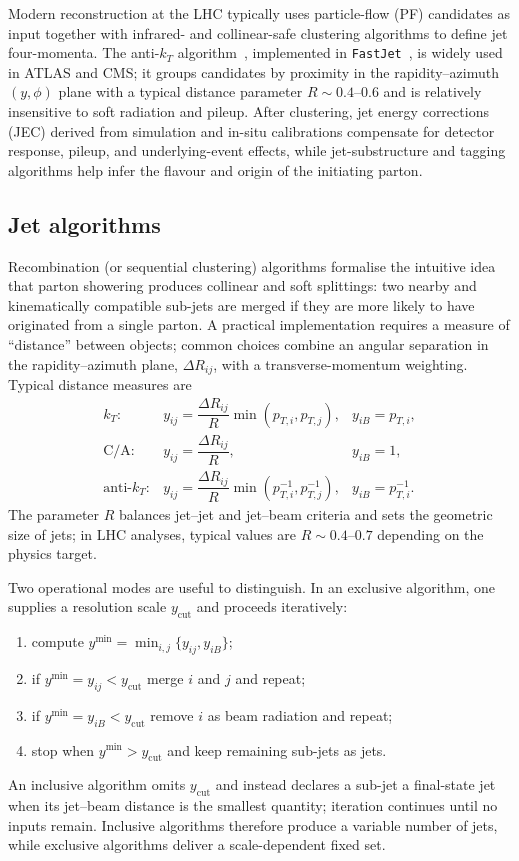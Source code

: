 Modern reconstruction at the LHC typically uses particle-flow (PF) candidates as input together with infrared- and collinear-safe clustering algorithms to define jet four-momenta. The anti-$k_T$ algorithm~\parencite{Cacciari:2008gp}, implemented in \texttt{FastJet}~\parencite{Cacciari:2011ma}, is widely used in ATLAS and CMS; it groups candidates by proximity in the rapidity–azimuth $(y,\phi)$ plane with a typical distance parameter $R\sim0.4$–0.6 and is relatively insensitive to soft radiation and pileup. After clustering, jet energy corrections (JEC) derived from simulation and in-situ calibrations compensate for detector response, pileup, and underlying-event effects, while jet-substructure and tagging algorithms help infer the flavour and origin of the initiating parton.

\subsection{Jet algorithms}

Recombination (or sequential clustering) algorithms formalise the intuitive idea that parton showering produces collinear and soft splittings: two nearby and kinematically compatible sub-jets are merged if they are more likely to have originated from a single parton. A practical implementation requires a measure of ``distance'' between objects; common choices combine an angular separation in the rapidity–azimuth plane, $\Delta R_{ij}$, with a transverse-momentum weighting. Typical distance measures are
\[
\begin{array}{lll}
k_T: & y_{ij}=\dfrac{\Delta R_{ij}}{R}\min(p_{T,i},p_{T,j}), & y_{iB}=p_{T,i},\\[6pt]
\mathrm{C/A}: & y_{ij}=\dfrac{\Delta R_{ij}}{R}, & y_{iB}=1,\\[6pt]
\text{anti-}k_T: & y_{ij}=\dfrac{\Delta R_{ij}}{R}\min(p_{T,i}^{-1},p_{T,j}^{-1}), & y_{iB}=p_{T,i}^{-1}.
\end{array}
\]
The parameter $R$ balances jet–jet and jet–beam criteria and sets the geometric size of jets; in LHC analyses, typical values are $R\sim0.4\text{--}0.7$ depending on the physics target.

Two operational modes are useful to distinguish. In an exclusive algorithm, one supplies a resolution scale $y_{\text{cut}}$ and proceeds iteratively:
\begin{enumerate}
  \item compute $y^{\min}=\min_{i,j}\{y_{ij},y_{iB}\}$;
  \item if $y^{\min}=y_{ij}<y_{\text{cut}}$ merge $i$ and $j$ and repeat;
  \item if $y^{\min}=y_{iB}<y_{\text{cut}}$ remove $i$ as beam radiation and repeat;
  \item stop when $y^{\min}>y_{\text{cut}}$ and keep remaining sub-jets as jets.
\end{enumerate}
An inclusive algorithm omits $y_{\text{cut}}$ and instead declares a sub-jet a final-state jet when its jet–beam distance is the smallest quantity; iteration continues until no inputs remain. Inclusive algorithms therefore produce a variable number of jets, while exclusive algorithms deliver a scale-dependent fixed set.

